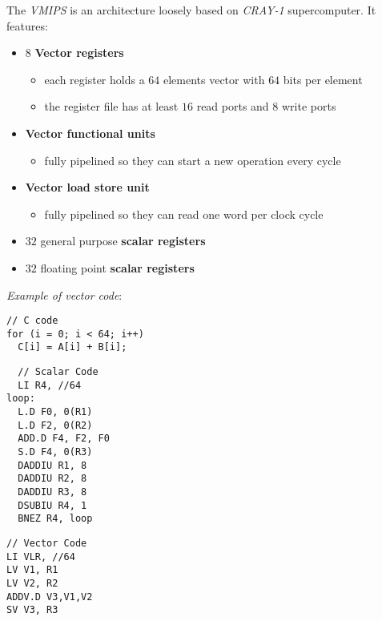 \documentclass[english]{article}
\begin{document}
The \textit{VMIPS} is an architecture loosely based on \textit{CRAY-1} supercomputer.
It features:

\begin{itemize}
  \item \(8\) \textbf{Vector registers}
        \begin{itemize}
          \item each register holds a \(64\) elements vector with \(64\) bits per element
          \item the register file has at least \(16\) read ports and \(8\) write ports
        \end{itemize}
  \item \textbf{Vector functional units}
        \begin{itemize}
          \item fully pipelined so they can start a new operation every cycle
        \end{itemize}
  \item \textbf{Vector load store unit}
        \begin{itemize}
          \item fully pipelined so they can read one word per clock cycle
        \end{itemize}
  \item \(32\) general purpose \textbf{scalar registers}
  \item \(32\) floating point \textbf{scalar registers}
\end{itemize}

\bigskip
\textit{Example of vector code}:

\begin{center}
  \bigskip
  \begin{verbatim}
// C code
for (i = 0; i < 64; i++)
  C[i] = A[i] + B[i];
\end{verbatim}
\end{center}

\begin{minipage}[t]{0.495\textwidth}
  \begin{verbatim}
  // Scalar Code
  LI R4, //64
loop:
  L.D F0, 0(R1)
  L.D F2, 0(R2)
  ADD.D F4, F2, F0
  S.D F4, 0(R3)
  DADDIU R1, 8
  DADDIU R2, 8
  DADDIU R3, 8
  DSUBIU R4, 1
  BNEZ R4, loop
\end{verbatim}
\end{minipage}
\begin{minipage}[t]{0.495\textwidth}
  \begin{verbatim}
// Vector Code
LI VLR, //64
LV V1, R1
LV V2, R2
ADDV.D V3,V1,V2
SV V3, R3
  \end{verbatim}
\end{minipage}
\end{document}
